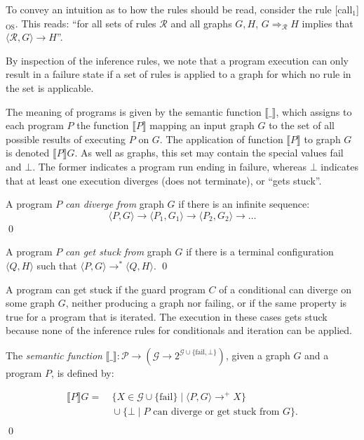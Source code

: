 \documentclass{llncs}
\newcommand{\G}{\mathcal{G}}
\newcommand{\R}{\mathcal{R}}
\begin{document}
	To convey an intuition as to how the rules should be read, consider the rule [call$_1$]$_\text{OS}$. This reads: ``for all sets of rules $\R$ and all graphs $G,H$, $G\Rightarrow_\R H$ implies that $\langle \R,G \rangle \rightarrow H$''.


	By inspection of the inference rules, we note that a program execution can only result in a failure state if a set of rules is applied to a graph for which no rule in the set is applicable.

	The meaning of programs is given by the semantic function $\llbracket \_ \rrbracket$, which assigns to each program $P$ the function $\llbracket P \rrbracket$ mapping an input graph $G$ to the set of all possible results of executing $P$ on $G$. The application of function $\llbracket P \rrbracket$ to graph $G$ is denoted $\llbracket P \rrbracket G$. As well as graphs, this set may contain the special values fail and $\bot$. The former indicates a program run ending in failure, whereas $\bot$ indicates that at least one execution diverges (does not terminate), or ``gets stuck''.

	\begin{definition}[Divergence]\rm
		A program $P$ \emph{can diverge from} graph $G$ if there is an infinite sequence:
		\[ \langle P, G \rangle \rightarrow \langle P_1, G_1 \rangle \rightarrow \langle P_2, G_2 \rangle \rightarrow \dots \]
		\qed
	\end{definition}

	\begin{definition}\rm
		A program $P$ \emph{can get stuck from} graph $G$ if there is a terminal configuration $\langle Q, H \rangle$ such that $\langle P, G \rangle \rightarrow^* \langle Q, H \rangle$.
		\qed
	\end{definition}

	A program can get stuck if the guard program $C$ of a conditional can diverge on some graph $G$, neither producing a graph nor failing, or if the same property is true for a program that is iterated. The execution in these cases gets stuck because none of the inference rules for conditionals and iteration can be applied.


	\begin{definition}\label{def:semantic_function}\rm
	The \emph{semantic function} $\llbracket \_ \rrbracket\!: \mathcal{P}\rightarrow (\G \rightarrow 2^{\G \cup \{\text{fail},\bot\}} )$, given a graph $G$ and a program $P$, is defined by:


	\begin{align*}
		\llbracket P \rrbracket G =& \ \{ X \in \G \cup \{\text{fail}\} \mid \langle P, G \rangle \rightarrow^+ X \}\\
		& \ \cup \{ \bot \mid \text{$P$ can diverge or get stuck from $G$}\}.\\
	\end{align*}
	\noindent	\qed
	\end{definition}
\end{document}
